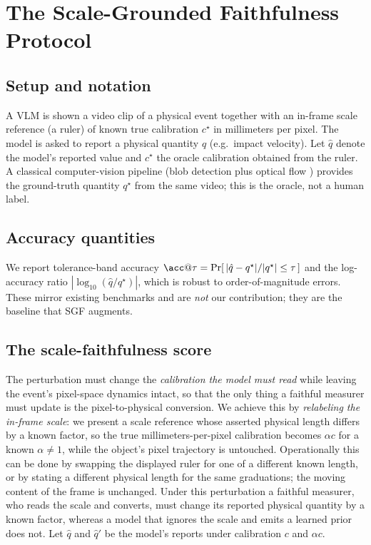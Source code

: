 \documentclass[11pt]{article}
\begin{document}
\section{The Scale-Grounded Faithfulness Protocol}
\label{sec:method}

\subsection{Setup and notation}
A VLM is shown a video clip of a physical event together with an in-frame scale
reference (a ruler) of known true calibration $c^\star$ in millimeters per pixel.
The model is asked to report a physical quantity $q$ (e.g.\ impact velocity).
Let $\hat q$ denote the model's reported value and $c^\star$ the oracle
calibration obtained from the ruler. A classical computer-vision pipeline
(blob detection plus optical flow \citep{horn1981optical}) provides the
ground-truth quantity $q^\star$ from the same video; this is the oracle, not a
human label.

\subsection{Accuracy quantities}
We report tolerance-band accuracy $\acc@\tau = \Pr[\,|\hat q - q^\star|/|q^\star|
\le \tau\,]$ and the log-accuracy ratio $|\log_{10}(\hat q / q^\star)|$, which is
robust to order-of-magnitude errors. These mirror existing benchmarks and are
\emph{not} our contribution; they are the baseline that SGF augments.

\subsection{The scale-faithfulness score}
The perturbation must change the \emph{calibration the model must read} while
leaving the event's pixel-space dynamics intact, so that the only thing a faithful
measurer must update is the pixel-to-physical conversion. We achieve this by
\emph{relabeling the in-frame scale}: we present a scale reference whose asserted
physical length differs by a known factor, so the true millimeters-per-pixel
calibration becomes $\alpha c$ for a known $\alpha\ne1$, while the object's pixel
trajectory is untouched. Operationally this can be done by swapping the displayed
ruler for one of a different known length, or by stating a different physical
length for the same graduations; the moving content of the frame is unchanged.
Under this perturbation a faithful measurer, who reads the scale and converts,
must change its reported physical quantity by a known factor, whereas a model that
ignores the scale and emits a learned prior does not. Let $\hat q$ and $\hat q'$
be the model's reports under calibration $c$ and $\alpha c$.
\end{document}
